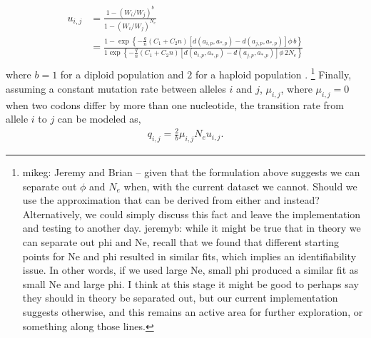 \documentclass{article}
\newcommand{\Ne}{\ensuremath{{N_e}}\xspace} %
\newcommand{\aip}{\ensuremath{a_{i,p}}\xspace}
\newcommand{\ajp}{\ensuremath{a_{j,p}}\xspace}
\newcommand{\aoptp}{\ensuremath{a_{*,p}}\xspace}
\newcommand{\cveci}{\ensuremath{\cvec_i}\xspace}
\newcommand{\cvecj}{\ensuremath{\cvec_j}\xspace}
\newcommand{\cvec}{\ensuremath{\Vec{c}}\xspace}
\newcommand{\kmax}{\ensuremath{{k_{\max}}}\xspace}
\newcommand{\muij}{\ensuremath{\mu_{i,j}}\xspace}
\begin{document}
\begin{align*}
  u_{i,j} &=  \frac{1 - \left(W_i/W_j\right)^b}{1 - \left(W_i/W_j\right)^\Ne}\\
   &= \frac{1- \exp\left\{- \frac{q}{n} \left(C_1 + C_2 n\right) \left[d\left(\aip,\aoptp\right) - d\left(\ajp,\aoptp\right)\right] \phi \,  b\right\}}  {1\exp\left\{- \frac{q}{n} \left(C_1 + C_2 n\right) \left[d\left(\aip,\aoptp\right) - d\left(\ajp,\aoptp\right)\right] \phi \, 2\Ne\right\}}\\
\end{align*}
where $b=1$ for a diploid population and $2$ for a haploid population \citep{Kimura1962,Wright1969,Iwasa1988,BergAndLassig2003,SellaAndHirsh2005}.
\footnote{mikeg: Jeremy and Brian -- given that the formulation above suggests we can separate out $\phi$ and $\Ne$ when, with the current dataset we cannot.  
Should we use the approximation that can be derived from either \citet{SellaAndHirsh2005} and \citet{Kimura1962} instead?
Alternatively, we could simply discuss this fact and leave the implementation and testing to another day.
jeremyb: while it might be true that in theory we can separate out phi and Ne, recall that we found that different starting points for Ne and phi resulted in similar fits, which implies an identifiability issue. 
In other words, if we used large Ne, small phi produced a similar fit as small Ne and large phi.
I think at this stage it might be good to perhaps say they should in theory be separated out, but our current implementation suggests otherwise, and this remains an active area for further exploration, or something along those lines.
}
Finally, assuming a constant mutation rate between alleles $i$ and $j$, $\muij$, where $\muij = 0$ when two codons differ by more than one nucleotide, the transition rate from allele $i$ to $j$ can be modeled as,
\begin{align*}
  q_{i,j} = \frac{2}{b} \muij \Ne u_{i,j}.
\end{align*}
\end{document}
